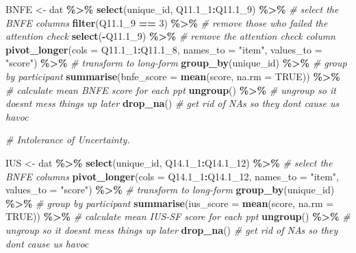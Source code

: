 \documentclass[
  oneside]{book}
\newenvironment{Shaded}{\begin{snugshade}}{\end{snugshade}}
\newcommand{\AttributeTok}[1]{\textcolor[rgb]{0.13,0.29,0.53}{#1}}
\newcommand{\CommentTok}[1]{\textcolor[rgb]{0.56,0.35,0.01}{\textit{#1}}}
\newcommand{\ConstantTok}[1]{\textcolor[rgb]{0.56,0.35,0.01}{#1}}
\newcommand{\DecValTok}[1]{\textcolor[rgb]{0.00,0.00,0.81}{#1}}
\newcommand{\FloatTok}[1]{\textcolor[rgb]{0.00,0.00,0.81}{#1}}
\newcommand{\FunctionTok}[1]{\textcolor[rgb]{0.13,0.29,0.53}{\textbf{#1}}}
\newcommand{\NormalTok}[1]{#1}
\newcommand{\OtherTok}[1]{\textcolor[rgb]{0.56,0.35,0.01}{#1}}
\newcommand{\SpecialCharTok}[1]{\textcolor[rgb]{0.81,0.36,0.00}{\textbf{#1}}}
\newcommand{\StringTok}[1]{\textcolor[rgb]{0.31,0.60,0.02}{#1}}
\begin{document}
\begin{Shaded}
\begin{Highlighting}[]
\NormalTok{BNFE }\OtherTok{\textless{}{-}}\NormalTok{ dat }\SpecialCharTok{\%\textgreater{}\%}
  \FunctionTok{select}\NormalTok{(unique\_id, Q11}\FloatTok{.1}\NormalTok{\_1}\SpecialCharTok{:}\NormalTok{Q11}\FloatTok{.1}\NormalTok{\_9) }\SpecialCharTok{\%\textgreater{}\%} \CommentTok{\# select the BNFE columns}
  \FunctionTok{filter}\NormalTok{(Q11}\FloatTok{.1}\NormalTok{\_9 }\SpecialCharTok{==} \DecValTok{3}\NormalTok{) }\SpecialCharTok{\%\textgreater{}\%} \CommentTok{\# remove those who failed the attention check}
  \FunctionTok{select}\NormalTok{(}\SpecialCharTok{{-}}\NormalTok{Q11}\FloatTok{.1}\NormalTok{\_9) }\SpecialCharTok{\%\textgreater{}\%} \CommentTok{\# remove the attention check column}
  \FunctionTok{pivot\_longer}\NormalTok{(}\AttributeTok{cols =}\NormalTok{ Q11}\FloatTok{.1}\NormalTok{\_1}\SpecialCharTok{:}\NormalTok{Q11}\FloatTok{.1}\NormalTok{\_8, }\AttributeTok{names\_to =} \StringTok{"item"}\NormalTok{, }\AttributeTok{values\_to =} \StringTok{"score"}\NormalTok{) }\SpecialCharTok{\%\textgreater{}\%} \CommentTok{\# transform to long{-}form}
  \FunctionTok{group\_by}\NormalTok{(unique\_id) }\SpecialCharTok{\%\textgreater{}\%} \CommentTok{\# group by participant}
  \FunctionTok{summarise}\NormalTok{(}\AttributeTok{bnfe\_score =} \FunctionTok{mean}\NormalTok{(score, }\AttributeTok{na.rm =} \ConstantTok{TRUE}\NormalTok{)) }\SpecialCharTok{\%\textgreater{}\%} \CommentTok{\# calculate mean BNFE score for each ppt}
  \FunctionTok{ungroup}\NormalTok{() }\SpecialCharTok{\%\textgreater{}\%} \CommentTok{\# ungroup so it doesn\textquotesingle{}t mess things up later}
  \FunctionTok{drop\_na}\NormalTok{() }\CommentTok{\#  get rid of NAs so they don\textquotesingle{}t cause us havoc}

\CommentTok{\# Intolerance of Uncertainty.}

\NormalTok{IUS }\OtherTok{\textless{}{-}}\NormalTok{ dat }\SpecialCharTok{\%\textgreater{}\%}
  \FunctionTok{select}\NormalTok{(unique\_id, Q14}\FloatTok{.1}\NormalTok{\_1}\SpecialCharTok{:}\NormalTok{Q14}\FloatTok{.1}\NormalTok{\_12) }\SpecialCharTok{\%\textgreater{}\%} \CommentTok{\# select the BNFE columns}
  \FunctionTok{pivot\_longer}\NormalTok{(}\AttributeTok{cols =}\NormalTok{ Q14}\FloatTok{.1}\NormalTok{\_1}\SpecialCharTok{:}\NormalTok{Q14}\FloatTok{.1}\NormalTok{\_12, }\AttributeTok{names\_to =} \StringTok{"item"}\NormalTok{, }\AttributeTok{values\_to =} \StringTok{"score"}\NormalTok{) }\SpecialCharTok{\%\textgreater{}\%} \CommentTok{\# transform to long{-}form}
  \FunctionTok{group\_by}\NormalTok{(unique\_id) }\SpecialCharTok{\%\textgreater{}\%} \CommentTok{\# group by participant}
  \FunctionTok{summarise}\NormalTok{(}\AttributeTok{ius\_score =} \FunctionTok{mean}\NormalTok{(score, }\AttributeTok{na.rm =} \ConstantTok{TRUE}\NormalTok{)) }\SpecialCharTok{\%\textgreater{}\%} \CommentTok{\# calculate mean IUS{-}SF score for each ppt}
  \FunctionTok{ungroup}\NormalTok{() }\SpecialCharTok{\%\textgreater{}\%} \CommentTok{\# ungroup so it doesn\textquotesingle{}t mess things up later}
  \FunctionTok{drop\_na}\NormalTok{() }\CommentTok{\#  get rid of NAs so they don\textquotesingle{}t cause us havoc}


\end{Highlighting}
\end{Shaded}
\end{document}
